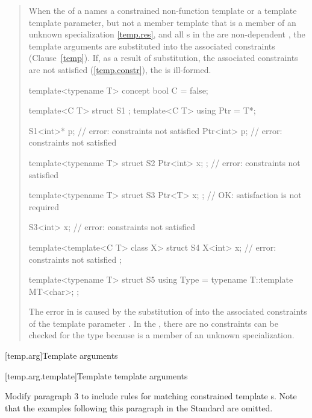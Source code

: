 \begin{quote}
\setcounter{Paras}{7}
\pnum
When the  of a  names
a constrained non-function template or a template template parameter,
but not a member template that is a member of an unknown specialization
\ref{temp.res}, and all s in the
 are non-dependent , the 
template arguments are substituted into the associated constraints
(Clause~\ref{temp}). 
% 
If, as a result of substitution, the associated constraints are not 
satisfied (\ref{temp.constr}), the  is ill-formed.
% 
\enterexample
\begin{codeblock}
template<typename T> concept bool C = false;

template<C T> struct S1 { };
template<C T> using Ptr = T*;

S1<int>* p; // error: constraints not satisfied
Ptr<int> p; // error: constraints not satisfied

template<typename T>
  struct S2 { Ptr<int> x; }; // error: constraints not satisfied

template<typename T>
  struct S3 { Ptr<T> x; };   // OK: satisfaction is not required

S3<int> x;                   // error: constraints not satisfied

template<template<C T> class X>
  struct S4 {
    X<int> x; // error: constraints not satisfied
  };

template<typename T>
  struct S5 {
    using Type = typename T::template MT<char>;
  };
\end{codeblock}
The error in  is caused by the substitution of  into 
the associated constraints of the template parameter .
% 
In the , there are no constraints can be checked for the 
type  because  is a member
of an unknown specialization.
\exitexample
\end{quote}


[temp.arg]{Template arguments}

[temp.arg.template]{Template template arguments}

Modify paragraph 3 to include rules for matching constrained template 
s. Note that the examples following this 
paragraph in the \Cpp Standard are omitted.

